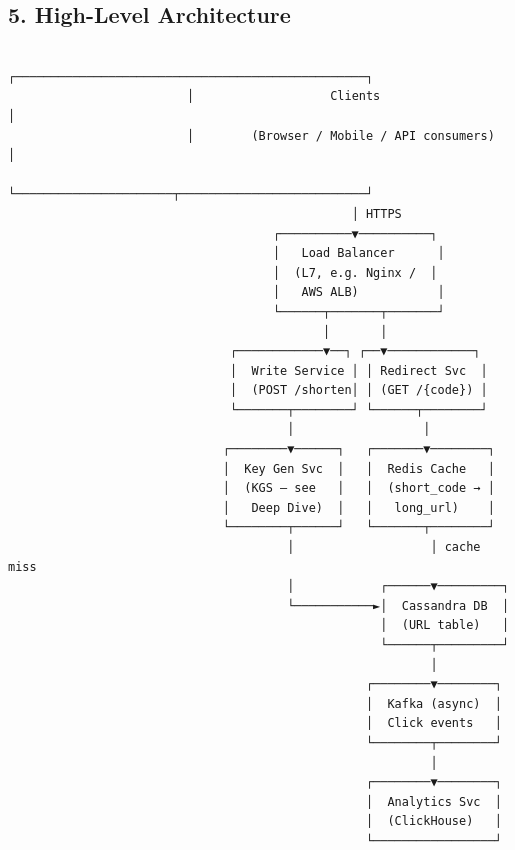 \documentclass[11pt]{article}
\begin{document}
\subsection{5. High-Level Architecture}\label{5-high-level-architecture}

\setcodelang{}

\begin{verbatim}
                         ┌─────────────────────────────────────────────────┐
                         │                   Clients                       │
                         │        (Browser / Mobile / API consumers)       │
                         └──────────────────────┬──────────────────────────┘
                                                │ HTTPS
                                     ┌──────────▼──────────┐
                                     │   Load Balancer      │
                                     │  (L7, e.g. Nginx /  │
                                     │   AWS ALB)           │
                                     └──────┬───────┬───────┘
                                            │       │
                               ┌────────────▼──┐ ┌──▼────────────┐
                               │  Write Service │ │ Redirect Svc  │
                               │  (POST /shorten│ │ (GET /{code}) │
                               └───────┬────────┘ └──────┬────────┘
                                       │                  │
                              ┌────────▼──────┐   ┌───────▼────────┐
                              │  Key Gen Svc  │   │  Redis Cache   │
                              │  (KGS — see   │   │  (short_code → │
                              │   Deep Dive)  │   │   long_url)    │
                              └────────┬──────┘   └───────┬────────┘
                                       │                   │ cache miss
                                       │            ┌──────▼─────────┐
                                       └───────────►│  Cassandra DB  │
                                                    │  (URL table)   │
                                                    └──────┬─────────┘
                                                           │
                                                  ┌────────▼────────┐
                                                  │  Kafka (async)  │
                                                  │  Click events   │
                                                  └────────┬────────┘
                                                           │
                                                  ┌────────▼────────┐
                                                  │  Analytics Svc  │
                                                  │  (ClickHouse)   │
                                                  └─────────────────┘
\end{verbatim}
\end{document}
